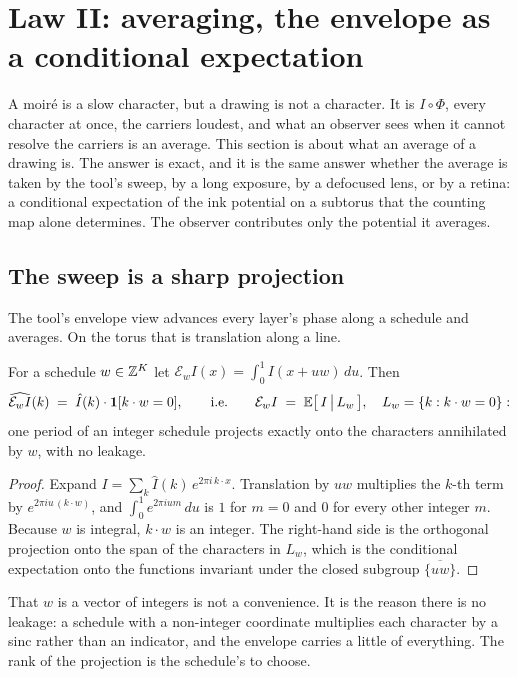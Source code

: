 \section{Law II: averaging, the envelope as a conditional expectation}
\label{sec:averaging}

A moir\'e is a slow character, but a drawing is not a character. It is
$I\circ\Phi$, every character at once, the carriers loudest, and what an
observer sees when it cannot resolve the carriers is an average. This section
is about what an average of a drawing is. The answer is exact, and it is the
same answer whether the average is taken by the tool's sweep, by a long
exposure, by a defocused lens, or by a retina: a conditional expectation of the
ink potential on a subtorus that the counting map alone determines. The
observer contributes only the potential it averages.

\subsection{The sweep is a sharp projection}
\label{sec:sweep}

The tool's envelope view advances every layer's phase along a schedule and
averages. On the torus that is translation along a line.

\begin{theorem}
\label{thm:envelope}
For a schedule $w\in\mathbb{Z}^K$ let $\mathcal E_w I(x)=\int_0^1 I(x+uw)\,du$. Then
\[
  \widehat{\mathcal E_w I}(k)\;=\;\hat I(k)\cdot\mathbf 1[k\cdot w=0],
  \qquad\text{i.e.}\qquad
  \mathcal E_w I \;=\; \mathbb{E}\big[\,I\,\big|\,L_w\,\big],\quad L_w=\{k:k\cdot w=0\}:
\]
one period of an integer schedule projects exactly onto the characters
annihilated by $w$, with no leakage.
\end{theorem}

\begin{proof}
Expand $I=\sum_k\hat I(k)\,e^{2\pi i\,k\cdot x}$. Translation by $uw$
multiplies the $k$-th term by $e^{2\pi i u\,(k\cdot w)}$, and
$\int_0^1 e^{2\pi i u m}\,du$ is $1$ for $m=0$ and $0$ for every other integer
$m$. Because $w$ is integral, $k\cdot w$ is an integer. The right-hand side is
the orthogonal projection onto the span of the characters in $L_w$, which is
the conditional expectation onto the functions invariant under the closed
subgroup $\overline{\{uw\}}$.
\end{proof}

That $w$ is a vector of integers is not a convenience. It is the reason there
is no leakage: a schedule with a non-integer coordinate multiplies each
character by a sinc rather than an indicator, and the envelope carries a little
of everything. The rank of the projection is the schedule's to choose.

